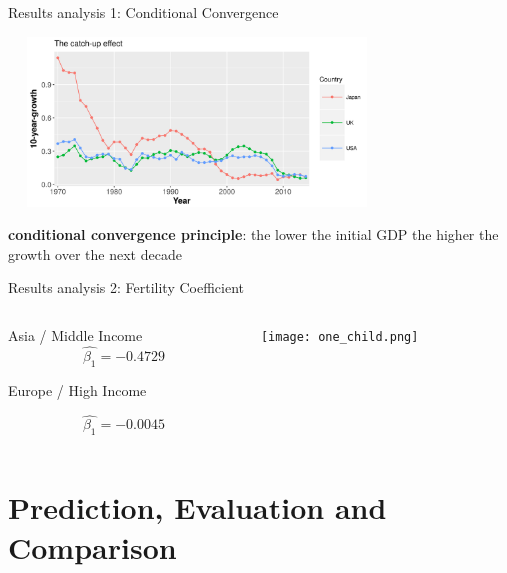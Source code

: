 \documentclass[9pt]{beamer}
\begin{document}
\begin{frame}{Results analysis 1: Conditional Convergence}
	
	\begin{block}{}
		\includegraphics[height=4.5cm,width=10cm]{convergence.png}
	\end{block}
	\begin{definition}
		\textbf{conditional convergence principle}: the lower the initial GDP the higher the growth over the next decade
	\end{definition}
			
\end{frame}
\begin{frame}{Results analysis 2: Fertility Coefficient}
	\begin{columns}[T] %
		\begin{column}[T]{5cm} %
			\begin{block}{Asia / Middle Income}
				 \[\hat{\beta_1}=-0.4729\]
				
				
			\end{block}	
			\begin{block}{Europe / High Income}
				
				\[\hat{\beta_1}=-0.0045\]
				
			\end{block}	
		\end{column}
		\begin{column}[T]{5cm} %
			\texttt{[image: one\_child.png]}
			
		\end{column}
	\end{columns}
\end{frame}

\section{Prediction, Evaluation and Comparison}
\end{document}
